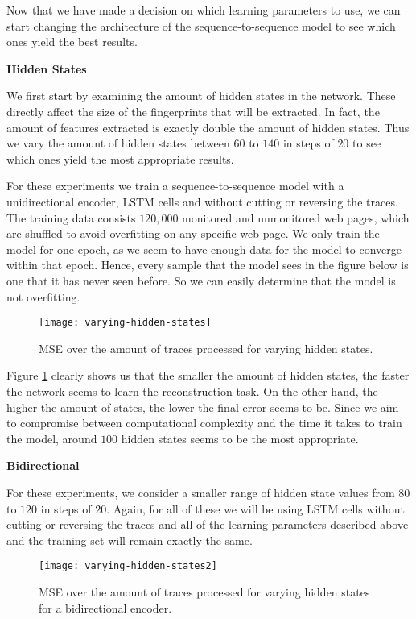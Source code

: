 Now that we have made a decision on which learning parameters to use, we can start changing the architecture of the sequence-to-sequence model to see which ones yield the best results.

\noindent
\textbf{Hidden States}

We first start by examining the amount of hidden states in the network.
These directly affect the size of the fingerprints that will be extracted.
In fact, the amount of features extracted is exactly double the amount of hidden states.
Thus we vary the amount of hidden states between $60$ to $140$ in steps of $20$ to see which ones yield the most appropriate results.

For these experiments we train a sequence-to-sequence model with a unidirectional encoder, LSTM cells and without cutting or reversing the traces.
The training data consists $120,000$ monitored and unmonitored web pages, which are shuffled to avoid overfitting on any specific web page.
We only train the model for one epoch, as we seem to have enough data for the model to converge within that epoch.
Hence, every sample that the model sees in the figure below is one that it has never seen before.
So we can easily determine that the model is not overfitting.

\begin{figure}[ht]
  \centering
  \texttt{[image: varying-hidden-states]}
  \caption{MSE over the amount of traces processed for varying hidden states.}
  \label{fig:varying-hidden-states}
\end{figure}

Figure \ref{fig:varying-hidden-states} clearly shows us that the smaller the amount of hidden states, the faster the network seems to learn the reconstruction task.
On the other hand, the higher the amount of states, the lower the final error seems to be.
Since we aim to compromise between computational complexity and the time it takes to train the model, around $100$ hidden states seems to be the most appropriate.

\noindent
\textbf{Bidirectional}

For these experiments, we consider a smaller range of hidden state values from $80$ to $120$ in steps of $20$.
Again, for all of these we will be using LSTM cells without cutting or reversing the traces and all of the learning parameters described above and the training set will remain exactly the same.

\begin{figure}[ht]
  \centering
  \texttt{[image: varying-hidden-states2]}
  \caption{MSE over the amount of traces processed for varying hidden states for a bidirectional encoder.}
  \label{fig:varying-hidden-states2}
\end{figure}

